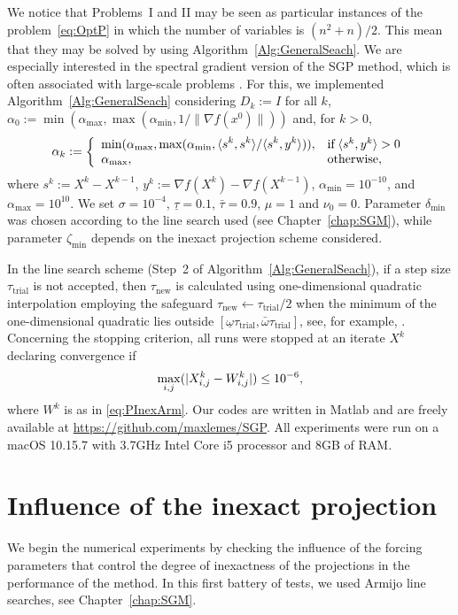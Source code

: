 We notice that Problems~I and II may be seen as particular instances of the problem~\eqref{eq:OptP} in which the number of variables is $(n^2+n)/2$. This mean that they may be solved by using Algorithm~\ref{Alg:GeneralSeach}.
We are especially interested in the spectral gradient version \cite{BirginMartinezRaydan2003,spgsiam} of the SGP method, which is often associated with large-scale problems \cite{JSSv060i03}. For this, we implemented Algorithm~\ref{Alg:GeneralSeach} considering $D_k:=I$ for all $k$, $\alpha_0 := \min(\alpha_{\max}, \max(\alpha_{\min}, 1/ \| \nabla f(x^0) \|))$ and, for $k>0$,
\begin{equation*}\label{spg}
	\alpha_k:=\left\{\begin{array}{ll}
		\displaystyle\min (\alpha_{\max},\max (\alpha_{\min},\langle s^k,s^k\rangle/\langle s^k,y^k\rangle)), & \mbox{if} \; \langle s^k,y^k\rangle > 0 \\
		\alpha_{\max},                                                                              & \mbox{otherwise},
	\end{array}\right.
\end{equation*}
where $s^k:=X^k - X^{k-1}$, $y^k:=\nabla f(X^k) - \nabla f(X^{k-1})$, $\alpha_{\min}=10^{-10}$, and $\alpha_{\max}=10^{10}$.
We set $\sigma = 10^{ -4}$, $\underline\tau=0.1$, $\bar\tau=0.9$, $\mu=1$ and $\nu_0=0$. Parameter $\delta_{\min}$ was chosen according to the line search used (see Chapter~\ref{chap:SGM}), while parameter $\zeta_{\min}$ depends on the inexact projection scheme considered.

In the line search scheme (Step~2 of Algorithm~\ref{Alg:GeneralSeach}), if a step size $\tau_{\textrm{trial}}$  is not accepted, then $\tau_{\textrm{new}}$ is calculated using one-dimensional quadratic interpolation employing the safeguard $\tau_{\textrm{new}}\gets \tau_{\textrm{trial}}/2$  when the minimum of the one-dimensional quadratic lies outside $[\underline\omega \tau_{\textrm{trial}}, \bar\omega \tau_{\textrm{trial}} ]$, see, for example,  \cite[Section 3.5]{nocedal2006numerical}.
Concerning the stopping criterion, all runs were stopped at an iterate $X^k$ declaring convergence if
$$\displaystyle \max_{i,j} (|X^k_{i,j}-W^k_{i,j}| )\leq 10^{-6},$$
where $W^k$ is as in \eqref{eq:PInexArm}.
Our codes are written in Matlab and are freely available at \url{https://github.com/maxlemes/SGP}. All experiments were run on a macOS 10.15.7 with 3.7GHz Intel Core i5 processor and 8GB of RAM.
\section{Influence of the inexact projection} \label{sec:forcing}
We begin the numerical experiments by checking the influence of the forcing parameters that control the degree of inexactness of the projections in the performance of the  method. In this first battery of tests, we used Armijo line searches, see Chapter~\ref{chap:SGM}.

